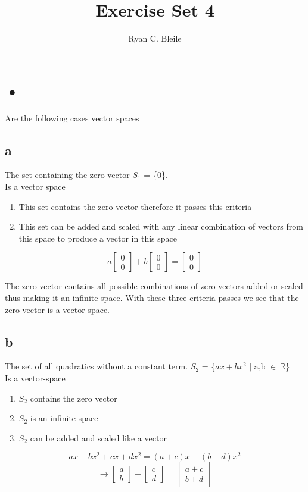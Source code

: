 \documentclass[12pt]{article}
\title{Exercise Set 4}
\author{Ryan C. Bleile}
\begin{document}
\maketitle

\section{•}
Are the following cases vector spaces
\subsection*{a}
The set containing the zero-vector $S_{1}$ = \{0\}.\\
Is a vector space\\
\begin{enumerate}
\item This set contains the zero vector therefore it passes this criteria
\item This set can be added and scaled with any linear combination of vectors from this space to produce a vector in this space
\end{enumerate}
\[
a
\begin{bmatrix}
0\\
0
\end{bmatrix}
+ b
\begin{bmatrix}
0\\
0
\end{bmatrix}
=
\begin{bmatrix}
0\\
0
\end{bmatrix}
\]

The zero vector contains all possible combinations of zero vectors added or scaled thus making it an infinite space. With these three criteria passes we see that the zero-vector is a vector space.

\subsection*{b}
The set of all quadratics without a constant term. $S_{2}$ = \{$ax+bx^{2}$ $|$ a,b $\in\ \mathbb{R}$\}\\
Is a vector-space\\
\begin{enumerate}
\item $S_{2}$ contains the zero vector
\item $S_{2}$ is an infinite space
\item $S_{2}$ can be added and scaled like a vector
\end{enumerate}
$$
ax + bx^{2} + cx + dx^{2} = (a+c)x + (b+d)x^{2}
$$
\[
\rightarrow
\begin{bmatrix}
a\\
b
\end{bmatrix}
+
\begin{bmatrix}
c\\
d
\end{bmatrix}
= 
\begin{bmatrix}
a+c\\
b+d
\end{bmatrix}
\]
\end{document}
